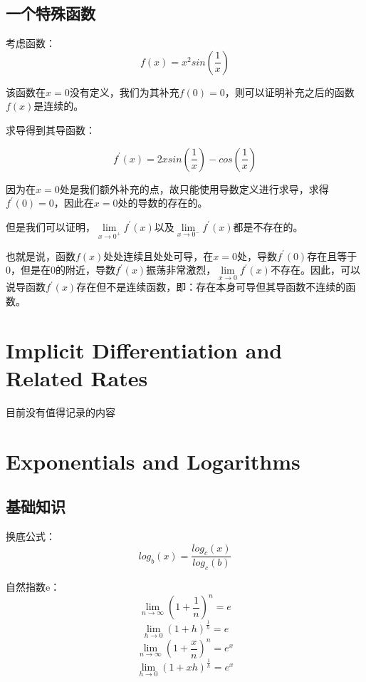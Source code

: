 \documentclass[11pt, b5paper, oneside]{book}
\begin{document}
\section{一个特殊函数}
考虑函数：
\[f(x) = x^2sin(\frac{1}{x})\]

该函数在$x=0$没有定义，我们为其补充$f(0)=0$，则可以证明补充之后的函数$f(x)$是连续的。

求导得到其导函数：

\[f^{'}(x) = 2xsin(\frac{1}{x})-cos(\frac{1}{x})\]

因为在$x=0$处是我们额外补充的点，故只能使用导数定义进行求导，求得$f^{'}(0)=0$，因此在$x=0$处的导数的存在的。

但是我们可以证明，$\lim\limits_{x \to 0^+}f^{'}(x)$以及$\lim\limits_{x \to 0^-}f^{'}(x)$都是不存在的。

也就是说，函数$f(x)$处处连续且处处可导，在$x=0$处，导数$f^{'}(0)$存在且等于0，但是在0的附近，导数$f^{'}(x)$振荡非常激烈，$\lim\limits_{x \to 0}f^{'}(x)$不存在。因此，可以说导函数$f^{'}(x)$存在但不是连续函数，即：存在本身可导但其导函数不连续的函数。

\chapter{Implicit Differentiation and Related Rates}

目前没有值得记录的内容

\chapter{Exponentials and Logarithms}

\section{基础知识}

换底公式：
\begin{equation}
    log_b(x) = \frac{log_c(x)}{log_c(b)}
\end{equation}

自然指数e：
\begin{equation}
    \lim\limits_{n\to \infty}(1+\frac{1}{n})^n = e
\end{equation}
\begin{equation}
    \lim\limits_{h\to 0}(1+h)^{\frac{1}{h}} = e
\end{equation}
\begin{equation}
    \lim\limits_{n\to \infty}(1+\frac{x}{n})^n = e^x
\end{equation}
\begin{equation}
    \lim\limits_{h\to 0}(1+xh)^{\frac{1}{h}} = e^x
\end{equation}
\end{document}

